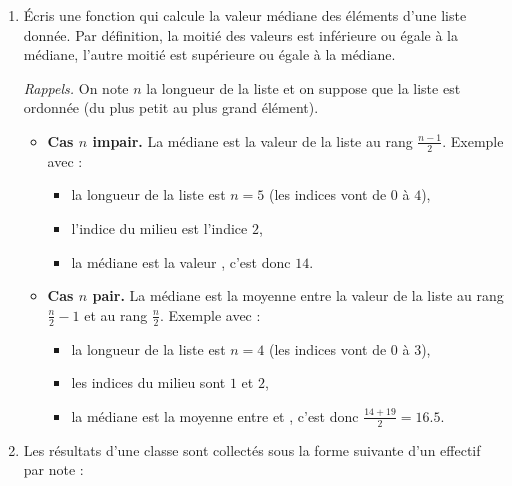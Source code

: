 \documentclass[11pt,class=report,crop=false]{standalone}
\begin{document}
\begin{activite}





\begin{enumerate}
  \item Écris une fonction  qui calcule la valeur médiane des éléments d'une liste donnée. Par définition, la moitié des valeurs est inférieure ou égale à la médiane, l'autre moitié est supérieure ou égale à la médiane.

  \emph{Rappels.} On note $n$ la longueur de la liste et on suppose que la liste est ordonnée (du plus petit au plus grand élément).
  \begin{itemize}
    \item \textbf{Cas $n$ impair.} La médiane est la valeur de la liste au rang $\frac{n-1}{2}$.    
    Exemple avec  :
    \begin{itemize}
      \item la longueur de la liste est $n=5$ (les indices vont de $0$ à $4$),
      \item l'indice du milieu est l'indice $2$,
      \item la médiane est la valeur , c'est donc $14$.
    \end{itemize}
    
    \item \textbf{Cas $n$ pair.} La médiane est la moyenne entre la valeur de la liste au rang $\frac{n}{2}-1$ et au rang $\frac{n}{2}$.
    Exemple avec  :
    \begin{itemize}
      \item la longueur de la liste est $n=4$ (les indices vont de $0$ à $3$),
      \item les indices du milieu sont $1$ et $2$,
      \item la médiane est la moyenne entre  et , c'est donc $\frac{14+19}{2} = 16.5$.
    \end{itemize}    
   \end{itemize} 
   
   
   
     
    \item Les résultats d'une classe sont collectés sous la forme suivante d'un effectif par note :   
    

\end{enumerate}
\end{activite}
\end{document}
